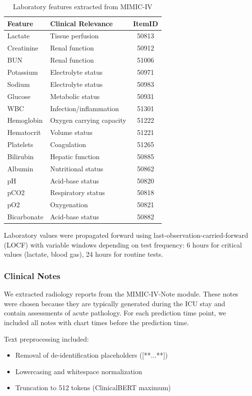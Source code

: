 \begin{table}[H]
\centering
\caption{Laboratory features extracted from MIMIC-IV}
\label{tab:labs}
\begin{tabular}{llc}
\toprule
\textbf{Feature} & \textbf{Clinical Relevance} & \textbf{ItemID} \\
\midrule
Lactate & Tissue perfusion & 50813 \\
Creatinine & Renal function & 50912 \\
BUN & Renal function & 51006 \\
Potassium & Electrolyte status & 50971 \\
Sodium & Electrolyte status & 50983 \\
Glucose & Metabolic status & 50931 \\
WBC & Infection/inflammation & 51301 \\
Hemoglobin & Oxygen carrying capacity & 51222 \\
Hematocrit & Volume status & 51221 \\
Platelets & Coagulation & 51265 \\
Bilirubin & Hepatic function & 50885 \\
Albumin & Nutritional status & 50862 \\
pH & Acid-base status & 50820 \\
pCO2 & Respiratory status & 50818 \\
pO2 & Oxygenation & 50821 \\
Bicarbonate & Acid-base status & 50882 \\
\bottomrule
\end{tabular}
\end{table}

Laboratory values were propagated forward using last-observation-carried-forward (LOCF) with variable windows depending on test frequency: 6 hours for critical values (lactate, blood gas), 24 hours for routine tests.

\subsubsection{Clinical Notes}

We extracted radiology reports from the MIMIC-IV-Note module. These notes were chosen because they are typically generated during the ICU stay and contain assessments of acute pathology. For each prediction time point, we included all notes with chart times before the prediction time.

Text preprocessing included:
\begin{itemize}
    \item Removal of de-identification placeholders ([**...**])
    \item Lowercasing and whitespace normalization
    \item Truncation to 512 tokens (ClinicalBERT maximum)
\end{itemize}

